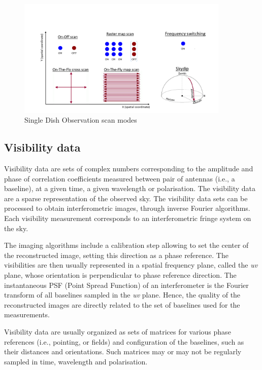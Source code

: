 \documentclass[11pt,a4paper]{ivoa}
\begin{document}
\begin{figure}[H]
\centering
\includegraphics[width=0.9\textwidth]{SingleDish.png}
\caption{Single Dish Observation scan modes}
\label{fig:SD}
\end{figure}



\subsection{Visibility data }
\label{sec:visibility}

Visibility data are sets of complex numbers corresponding to the amplitude and phase
of correlation coefficients measured between pair of antennas (i.e., a baseline), at
a given time, a given wavelength or polarisation. The visibility data are a sparse
representation of the observed sky. The visibility data sets can be processed to obtain
interferometric images, through inverse Fourier algorithms. Each visibility measurement
corresponds to an interferometric fringe system on the sky.

The imaging algorithms include a calibration step allowing to set the center of the
reconstructed image, setting this direction as a phase reference. The visibilities
are then usually represented in a spatial frequency plane, called the \emph{uv} plane,
whose orientation is perpendicular to phase reference direction. The instantaneous PSF
(Point Spread Function) of an interferometer is the Fourier transform of all baselines
sampled in the \emph{uv} plane. Hence, the quality of the reconstructed images are
directly related to the set of baselines used for the measurements.

Visibility data are usually organized as sets of matrices for various phase references
(i.e., pointing, or fields) and configuration of the baselines, such as their
distances and orientations. Such matrices may or may not be regularly sampled in time,
wavelength and polarisation.
\end{document}
